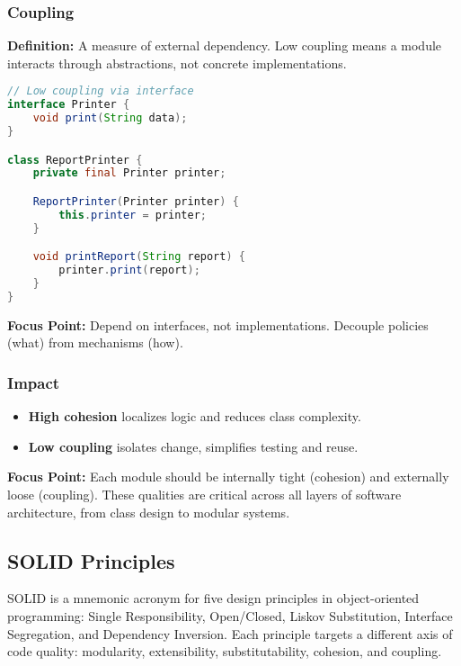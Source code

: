 \documentclass[a4paper,12pt]{article}
\begin{document}
\subsubsection{Coupling}

\textbf{Definition:} A measure of external dependency. Low coupling means a module interacts through abstractions, not concrete implementations.

\begin{lstlisting}[language=Java]
// Low coupling via interface
interface Printer {
    void print(String data);
}

class ReportPrinter {
    private final Printer printer;

    ReportPrinter(Printer printer) {
        this.printer = printer;
    }

    void printReport(String report) {
        printer.print(report);
    }
}
\end{lstlisting}

\textbf{Focus Point:} Depend on interfaces, not implementations. Decouple policies (what) from mechanisms (how).

\subsubsection{Impact}

\begin{itemize}
  \item \textbf{High cohesion} localizes logic and reduces class complexity.
  \item \textbf{Low coupling} isolates change, simplifies testing and reuse.
\end{itemize}

\textbf{Focus Point:} Each module should be internally tight (cohesion) and externally loose (coupling). These qualities are critical across all layers of software architecture, from class design to modular systems.

\subsection{SOLID Principles}

SOLID is a mnemonic acronym for five design principles in object-oriented programming: Single Responsibility, Open/Closed, Liskov Substitution, Interface Segregation, and Dependency Inversion. Each principle targets a different axis of code quality: modularity, extensibility, substitutability, cohesion, and coupling.
\end{document}
